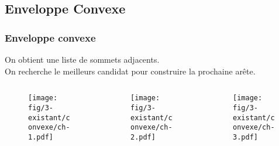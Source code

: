 \subsection{Enveloppe Convexe}

\begin{frame}
  \frametitle{Enveloppe convexe}

  \begin{block}{}
    On obtient une liste de sommets adjacents.\\
    On recherche le meilleurs candidat pour construire la prochaine arête.
  \end{block} 

  \begin{columns}[t]
 	 \begin{column}{3cm}
			\begin{figure}[h!]
	      \centering
	      \texttt{[image: fig/3-existant/convexe/ch-1.pdf]}
     	\end{figure}    
    \end{column}

    \begin{column}{3cm}
      \begin{figure}[h!]
		      \centering
		      \texttt{[image: fig/3-existant/convexe/ch-2.pdf]}
     	\end{figure}    
    \end{column}
			
		\begin{column}{3cm}
      \begin{figure}[h!]
		      \centering
		      \texttt{[image: fig/3-existant/convexe/ch-3.pdf]}
     	\end{figure}    
    \end{column}
        
	\end{columns}  

\end{frame}


